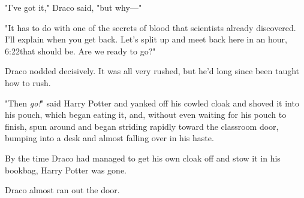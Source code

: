 "I've got it," Draco said, "but why---"

"It has to do with one of the secrets of blood that scientists already
discovered. I'll explain when you get back. Let's split up and meet back here
in an hour, 6:22\PM that should be. Are we ready to go?"

Draco nodded decisively. It was all very rushed, but he'd long since been
taught how to rush.

"Then \emph{go!}" said Harry Potter and yanked off his cowled cloak and shoved
it into his pouch, which began eating it, and, without even waiting for his
pouch to finish, spun around and began striding rapidly toward the classroom
door, bumping into a desk and almost falling over in his haste.

By the time Draco had managed to get his own cloak off and stow it in his
bookbag, Harry Potter was gone.

Draco almost ran out the door.
